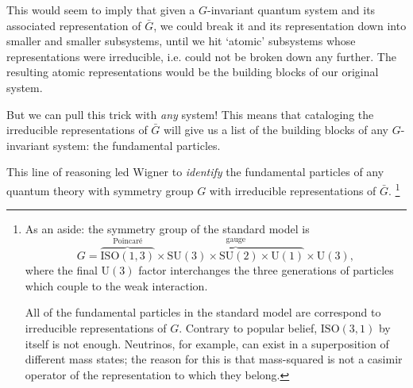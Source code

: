 \documentclass[a4paper,10pt]{scrreprt}
\theoremstyle{definition}
\theoremstyle{plain}
\theoremstyle{remark}
\begin{document}
This would seem to imply that given a $G$-invariant quantum system and its associated representation of $\bar{G}$, we could break it and its representation down into smaller and smaller subsystems, until we hit `atomic' subsystems whose representations were irreducible, i.e. could not be broken down any further. The resulting atomic representations would be the building blocks of our original system. 

But we can pull this trick with \emph{any} system! This means that cataloging the irreducible representations of $\bar{G}$ will give us a list of the building blocks of any $G$-invariant system: the fundamental particles.

This line of reasoning led Wigner to \emph{identify} the fundamental particles of any quantum theory with symmetry group $G$ with irreducible representations of $\bar{G}$. \footnote{As an aside: the symmetry group of the standard model is
\begin{equation*}
  G = \overbrace{\mathrm{ISO}(1, 3)}^{\text{Poincar\'{e}}} \times \overbrace{\mathrm{SU}(3) \times \mathrm{SU}(2) \times \mathrm{U}(1)}^{\text{gauge}} \times \mathrm{U}(3),
\end{equation*}
where the final $\mathrm{U}(3)$ factor interchanges the three generations of particles which couple to the weak interaction.

All of the fundamental particles in the standard model are correspond to irreducible representations of $G$. Contrary to popular belief, $\mathrm{ISO}(3, 1)$ by itself is not enough. Neutrinos, for example, can exist in a superposition of different mass states; the reason for this is that mass-squared is not a casimir operator of the representation to which they belong.\cite{neumaier}}
\end{document}
